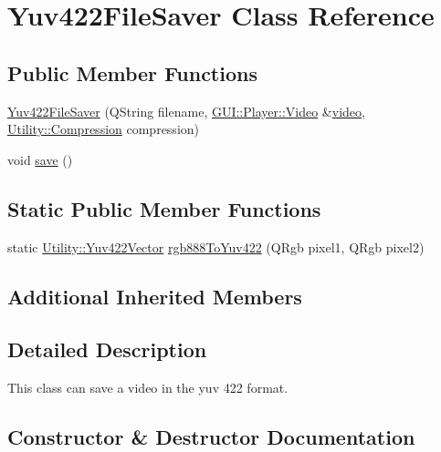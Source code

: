 \hypertarget{classUtility_1_1Yuv422FileSaver}{}\section{Yuv422\+File\+Saver Class Reference}
\label{classUtility_1_1Yuv422FileSaver}
\subsection*{Public Member Functions}
\begin{DoxyCompactItemize}
\item 
\hyperlink{classUtility_1_1Yuv422FileSaver_a156cc4a6fb746f1a8561811e5845ae4d}{Yuv422\+File\+Saver} (Q\+String filename, \hyperlink{classGUI_1_1Player_1_1Video}{G\+U\+I\+::\+Player\+::\+Video} \&\hyperlink{classUtility_1_1YuvFileSaver_ac39cb6d0a56308ca6323374fc0d74c96}{video}, \hyperlink{namespaceUtility_a56a83bf6847f4801f4205eb4be237ccf}{Utility\+::\+Compression} compression)
\item 
void \hyperlink{classUtility_1_1Yuv422FileSaver_aae2c382151ef7c9aa913361172b30db6}{save} ()
\end{DoxyCompactItemize}
\subsection*{Static Public Member Functions}
\begin{DoxyCompactItemize}
\item 
static \hyperlink{classUtility_1_1Yuv422Vector}{Utility\+::\+Yuv422\+Vector} \hyperlink{classUtility_1_1Yuv422FileSaver_a31a272c0c4297ae453507aff214e5e1e}{rgb888\+To\+Yuv422} (Q\+Rgb pixel1, Q\+Rgb pixel2)
\end{DoxyCompactItemize}
\subsection*{Additional Inherited Members}


\subsection{Detailed Description}
This class can save a video in the yuv 422 format. 

\subsection{Constructor \& Destructor Documentation}
\hypertarget{classUtility_1_1Yuv422FileSaver_a156cc4a6fb746f1a8561811e5845ae4d}{}

